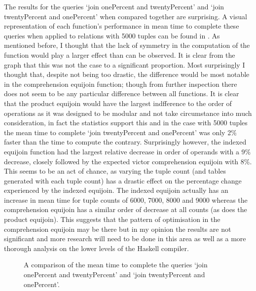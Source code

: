 The results for the queries `join onePercent and twentyPercent' and `join
twentyPercent and onePercent' when compared together are surprising. A visual
representation of each function's performance in mean time to complete these
queries when applied to relations with 5000 tuples can be found in 
. As mentioned before,
I thought that the lack of symmetry in the computation of the function would
play a larger effect than can be observed. It is clear from the graph that this
was not the case to a significant proportion. Most surprisingly I thought that,
despite not being too drastic, the difference would be most notable in the
comprehension equijoin function; though from further inspection there does not
seem to be any particular difference between all functions. It is clear that the
product equijoin would have the largest indfference to the order of operations
as it was designed to be modular and not take circumstance into much
consideration, in fact the statistics support this and in the case with 5000
tuples the mean time to complete `join twentyPercent and onePercent' was only
2\% faster than the time to compute the contrary. Surprisingly however, the
indexed equijoin function had the largest relative decrease in order of operands
with a 9\% decrease, closely followed by the expected victor comprehension
equijoin with 8\%. This seems to be an act of chance, as varying the tuple count
(and tables generated with each tuple count) has a drastic effect on the
percentage change experienced by the indexed equijoin. The indexed equijoin
actually has an increase in mean time for tuple counts of 6000, 7000, 8000 and
9000 whereas the comprehension equijoin has a similar order of decrease at all
counts (as does the product equijoin). This suggests that the pattern of
optimisation in the comprehension equijoin may be there but in my opinion the
results are not significant and more research will need to be done in this area
as well as a more thorough analysis on the lower levels of the Haskell compiler.

\begin{figure}[p]
    
    \caption{A comparison of the mean time to complete the queries `join
    onePercent and twentyPercent' and `join twentyPercent and onePercent'.}
    \label{fig:benchmark:onePercent-twentyPercent-flipped-5000}
\end{figure}
